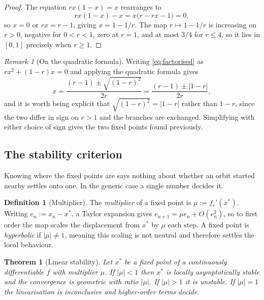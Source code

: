 \documentclass[11pt,a4paper]{article}
\newtheorem{theorem}[proposition]{Theorem}
\theoremstyle{definition}
\newtheorem{definition}[proposition]{Definition}
\theoremstyle{remark}
\newtheorem{remark}[proposition]{Remark}
\newcommand{\logmap}{f_r}
\begin{document}
\begin{proof}
The equation $rx(1-x)=x$ rearranges to
\begin{equation}
  rx(1-x)-x = x\bigl(r-rx-1\bigr) = 0 ,
  \label{eq:factorised}
\end{equation}
so $x=0$ or $rx=r-1$, giving $x=1-1/r$. The map $r\mapsto1-1/r$ is increasing
on $r>0$, negative for $0<r<1$, zero at $r=1$, and at most $3/4$ for $r\le4$,
so it lies in $[0,1]$ precisely when $r\ge1$.
\end{proof}

\begin{remark}[On the quadratic formula]
Writing \eqref{eq:factorised} as $rx^2+(1-r)x=0$ and applying the quadratic
formula gives
\begin{equation}
  x = \frac{(r-1)\pm\sqrt{(1-r)^2}}{2r} = \frac{(r-1)\pm|1-r|}{2r} ,
  \label{eq:quadratic}
\end{equation}
and it is worth being explicit that $\sqrt{(1-r)^2}=|1-r|$ rather than $1-r$,
since the two differ in sign on $r>1$ and the branches are exchanged.
Simplifying with either choice of sign gives the two fixed points found
previously.
\end{remark}

\subsection{The stability criterion}

Knowing where the fixed points are says nothing about whether an orbit started
nearby settles onto one. In the generic case a single number decides it.

\begin{definition}[Multiplier]
The \emph{multiplier} of a fixed point is $\mu:=\logmap'(x^{*})$. Writing
$e_n:=x_n-x^{*}$, a Taylor expansion gives $e_{n+1}=\mu e_n+O(e_n^2)$, so to
first order the map scales the displacement from $x^{*}$ by $\mu$ each step. A
fixed point is \emph{hyperbolic} if $|\mu|\neq1$, meaning this scaling is not
neutral and therefore settles the local behaviour.
\end{definition}

\begin{theorem}[Linear stability]
\label{thm:stability}
Let $x^{*}$ be a fixed point of a continuously differentiable $f$ with
multiplier $\mu$. If $|\mu|<1$ then $x^{*}$ is locally asymptotically stable
and the convergence is geometric with ratio $|\mu|$. If $|\mu|>1$ it is
unstable. If $|\mu|=1$ the linearisation is inconclusive and higher-order
terms decide.
\end{theorem}
\end{document}
